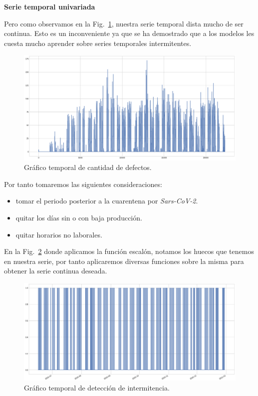 \documentclass[a4paper,12pt]{article}
\begin{document}
\textbf{Serie temporal univariada}

Pero como observamos en la Fig.~\ref{fig:graf_cantdef_antes}, nuestra serie temporal dista mucho de ser continua. Esto es un inconveniente ya que se ha demostrado que a los modelos les cuesta mucho aprender sobre series temporales intermitentes.

\begin{figure}[H]
	\begin{center}
	\includegraphics[width=1\textwidth]{tesis_78.png}
  	\caption{Gráfico temporal de cantidad de defectos.}
  	\label{fig:graf_cantdef_antes}
  	\end{center}
\end{figure}

Por tanto tomaremos las siguientes consideraciones:

\begin{itemize}
	\item tomar el periodo posterior a la cuarentena por \textit{Sars-CoV-2}.
	\item quitar los días sin o con baja producción.
	\item quitar horarios no laborales.
\end{itemize}

En la Fig.~\ref{fig:graf_inter_antes} donde aplicamos la función escalón, notamos los huecos que tenemos en nuestra serie, por tanto aplicaremos diversas funciones sobre la misma para obtener la serie continua deseada.

\begin{figure}[H]
	\begin{center}
	\includegraphics[width=1\textwidth]{tesis_79.png}
  	\caption{Gráfico temporal de detección de intermitencia.}
  	\label{fig:graf_inter_antes}
  	\end{center}
\end{figure}
\end{document}

